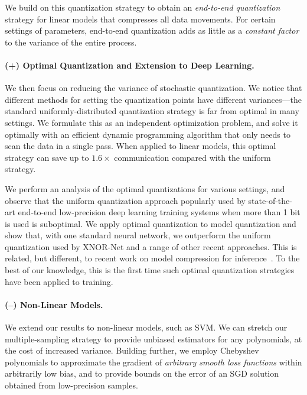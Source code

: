 \documentclass{article}
\begin{document}
\vspace{-0.5em}
We build on this quantization strategy to obtain an \emph{end-to-end quantization} strategy
for linear models that compresses all data movements. 
For certain settings of parameters, end-to-end quantization adds as little as a \emph{constant factor} to the variance of the entire process. 

\vspace{-1.5em}
\paragraph{(+) Optimal Quantization and Extension to Deep Learning.}
We then focus on reducing the variance of  
stochastic quantization. We notice that different methods for setting the quantization points have different variances---the standard uniformly-distributed quantization strategy is far from optimal in many settings.
We formulate this as an independent optimization problem, and solve it optimally with 
an efficient dynamic programming algorithm 
that only needs to scan the data in a single pass.
When applied to linear models, this optimal 
strategy can save up to $1.6\times$ communication
compared with the uniform strategy.

\vspace{-0.5em}
We perform an analysis of the optimal quantizations for various settings, and observe that the uniform quantization approach
popularly used by state-of-the-art end-to-end
low-precision deep learning training systems
when more than 1 bit is used is suboptimal.
We apply optimal quantization to 
model quantization and show that, with one
standard neural network, we outperform the
uniform quantization used by XNOR-Net and a
range of other recent approaches. This
is related, but different, to recent work 
on model compression for inference~\cite{Han:2016:ICLR}. 
To the best of our knowledge, this is the first time such optimal quantization strategies have been applied to training. 

\vspace{-1.5em}
\paragraph{(--) Non-Linear Models.} We extend our
results to non-linear models, such as SVM. We can stretch our multiple-sampling strategy to provide 
unbiased estimators for any polynomials, at the cost of increased variance. 
Building further, we employ Chebyshev polynomials to   
approximate the gradient of \emph{arbitrary smooth loss functions} within arbitrarily low bias, 
and to provide bounds on the error of an SGD solution obtained from low-precision samples. 
\end{document}
